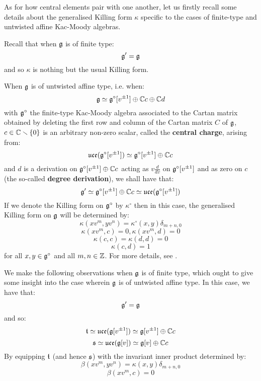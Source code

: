             As for how central elements pair with one another, let us firstly recall some details about the generalised Killing form $\kappa$ specific to the cases of finite-type and untwisted affine Kac-Moody algebras. 
            \begin{remark}
                Recall that when $\mathfrak{g}$ is of finite type:
                    $$\mathfrak{g}' = \mathfrak{g}$$
                and so $\kappa$ is nothing but the usual Killing form.
                
                When $\mathfrak{g}$ is of untwisted affine type, i.e. when:
                    $$\mathfrak{g} \simeq \mathfrak{g}^{\circ}[v^{\pm 1}] \oplus \mathbb{C} c \oplus \mathbb{C} d$$
                with $\mathfrak{g}^{\circ}$ the finite-type Kac-Moody algebra associated to the Cartan matrix obtained by deleting the first row and column of the Cartan matrix $C$ of $\mathfrak{g}$, $c \in \mathbb{C} \smallsetminus \{0\}$ is an arbitrary non-zero scalar, called the \textbf{central charge}, arising from:
                    $$\mathfrak{uce}(\mathfrak{g}^{\circ}[v^{\pm 1}]) \simeq \mathfrak{g}^{\circ}[v^{\pm 1}] \oplus \mathbb{C} c$$
                and $d$ is a derivation on $\mathfrak{g}^{\circ}[v^{\pm 1}] \oplus \mathbb{C} c$ acting as $v \frac{d}{dv}$ on $\mathfrak{g}^{\circ}[v^{\pm 1}]$ and as zero on $c$ (the so-called \textbf{degree derivation}), we shall have that:
                    $$\mathfrak{g}' \simeq \mathfrak{g}^{\circ}[v^{\pm 1}] \oplus \mathbb{C} c \simeq \mathfrak{uce}(\mathfrak{g}^{\circ}[v^{\pm 1}])$$
                If we denote the Killing form on $\mathfrak{g}^{\circ}$ by $\kappa^{\circ}$ then in this case, the generalised Killing form on $\mathfrak{g}$ will be determined by:
                    $$\kappa(x v^m, y v^n) = \kappa^{\circ}(x, y) \delta_{m + n, 0}$$
                    $$\kappa(x v^m, c) = 0, \kappa(x v^m, d) = 0$$
                    $$\kappa(c, c) = \kappa(d, d) = 0$$
                    $$\kappa(c, d) = 1$$
                for all $x, y \in \mathfrak{g}^{\circ}$ and all $m, n \in \mathbb{Z}$. For more details, see \cite[Chapter 7]{kac_infinite_dimensional_lie_algebras}.
            \end{remark}
            \begin{remark}
                We make the following observations when $\mathfrak{g}$ is of finite type, which ought to give some insight into the case wherein $\mathfrak{g}$ is of untwisted affine type. In this case, we have that:
                    $$\mathfrak{g}' = \mathfrak{g}$$
                and so:
                    $$\mathfrak{t} \simeq \mathfrak{uce}( \mathfrak{g}[v^{\pm 1}] ) \simeq \mathfrak{g}[v^{\pm 1}] \oplus \mathbb{C} c$$
                    $$\mathfrak{s} \simeq \mathfrak{uce}( \mathfrak{g}[v] ) \simeq \mathfrak{g}[v] \oplus \mathbb{C} c$$
                By equipping $\mathfrak{t}$ (and hence $\mathfrak{s}$) with the invariant inner product determined by:
                    $$\beta(x v^m, y v^n) = \kappa(x, y) \delta_{m + n, 0}$$
                    $$\beta(x v^m, c) = 0$$
            \end{remark}
            
